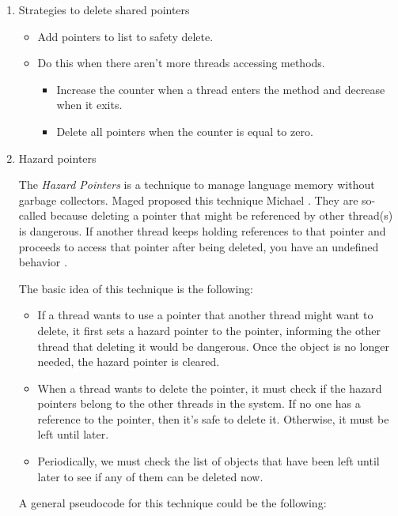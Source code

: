 \begin{enumerate}
\item Strategies to delete shared pointers
\label{sec:org36ce5a6}

\begin{itemize}
\item Add pointers to list to safety delete.
\item Do this when there aren't more threads accessing methods.
\begin{itemize}
\item Increase the counter when a thread enters the method and decrease when
it exits.
\item Delete all pointers when the counter is equal to zero.
\end{itemize}
\end{itemize}


\item Hazard pointers
\label{sec:org3992578}

The \emph{Hazard Pointers} is a technique to manage language memory without garbage collectors. Maged proposed this technique
Michael \cite{DBLP_journals_tpds_Michael04}. They are so-called because
deleting a pointer that might be referenced by other thread(s) is
dangerous. If another thread keeps holding references to that pointer and
proceeds to access that pointer after being deleted, you have an undefined
behavior \cite{DBLP_journals_tpds_Michael04}.

The basic idea of this technique is the following:

\begin{itemize}
\item If a thread wants to use a pointer that another thread might want to
delete, it first sets a hazard pointer to the pointer, informing the
other thread that deleting it would be dangerous. Once the object
is no longer needed, the hazard pointer is cleared.
\item When a thread wants to delete the pointer, it must check if the hazard
pointers belong to the other threads in the system. If no one has a
reference to the pointer, then it's safe to delete it. Otherwise, it must be left until later.
\item Periodically, we must check the list of objects that have been left until
later to see if any of them can be deleted now.
\end{itemize}

A general pseudocode for this technique could be the following:


\end{enumerate}
